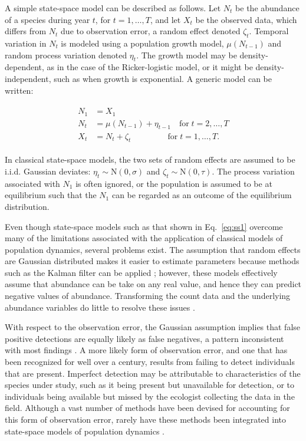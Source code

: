 \documentclass[12pt,english]{article}
\begin{document}
\begin{spacing}{1.9}
\begin{flushleft}
A simple state-space model can be described as follows.
Let $N_t$ be the abundance of a species during year $t$, for
$t=1,\hdots,T$, and let $X_t$ be
the observed data, which differs from $N_t$ due to observation error,
a random effect denoted $\zeta_t$. Temporal variation in $N_t$ is
modeled using a population growth model, $\mu(N_{t-1})$
and random process variation denoted $\eta_t$.
The growth model may be density-dependent, as in the case of the 
Ricker-logistic model, or it might be density-independent, such as when growth
is exponential.
A generic model can be written: 
\begin{linenomath*}
\begin{gather}
  \label{eq:ss1}
  \begin{align}
    N_1 &= X_1 \nonumber \\
N_t &= \mu(N_{t-1}) + \eta_{t-1} \quad \text{for} \;
t=2,\hdots,T  \\
X_t &= N_t + \zeta_t \qquad \qquad \;\, \text{for} \;
t=1,\hdots,T. \nonumber 
  \end{align}
\end{gather}
\end{linenomath*}
In classical
state-space models, the two sets of random effects
are assumed to be i.i.d. Gaussian deviates:
$\eta_t \sim \mathrm{N}(0, \sigma)$ and
$\zeta_t \sim \mathrm{N}(0, \tau)$. 
The process variation associated with $N_1$ is often ignored, or
the population is assumed to be at equilibrium such that the $N_1$ can
be regarded as an outcome of the equilibrium distribution.

Even though state-space models such as that shown in Eq.~\ref{eq:ss1}
overcome many of the limitations associated with the application of
classical models of population dynamics, 
several problems exist. 
The assumption that random effects are Gaussian distributed makes it
easier to estimate parameters because methods such as the Kalman
filter can be applied 
\citep{dennis_etal:2006}; however, 
these models effectively assume that abundance can be take on any
real value, and hence they can predict negative values of abundance. 
Transforming the count data and the underlying abundance variables 
do little to resolve these issues \citep{ohara_kotze:2010}.

With respect to the observation error, the Gaussian assumption
implies that false positive detections are
equally likely as false negatives, a pattern inconsistent with most
findings \citep{miller_etal:2011}. 
A more likely form of observation error, and one that has been recognized for well
over a century, results from failing to detect individuals that are
present. Imperfect detection may be attributable to
characteristics of the species under study, such as it being present but unavailable for detection,
or to individuals being available but missed by the ecologist collecting the data in the field.
Although a vast number of methods have been devised for accounting for
this form of observation error, rarely have these methods been
integrated into state-space models of population dynamics \citep[but
see][]{buckland_etal:2004}.


\end{flushleft}
\end{spacing}
\end{document}
